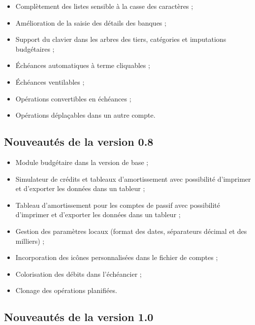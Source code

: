 \begin{itemize}
	\item Complètement des listes sensible à la casse des caractères ;
	\item Amélioration de la saisie des détails des banques ;
	\item Support du clavier dans les arbres des tiers, catégories et imputations 
budgétaires ;
	\item Échéances automatiques à terme cliquables ;
	\item Échéances ventilables ;
	\item Opérations convertibles en échéances ;
	\item Opérations déplaçables dans un autre compte.
\end{itemize}


\subsection{Nouveautés de la version 0.8}

\begin{itemize}
	\item Module budgétaire dans la version de base ;
	\item Simulateur de crédits et tableaux d'amortissement avec possibilité d'imprimer et d'exporter les données dans un tableur ;
	\item Tableau d'amortissement pour les comptes de passif avec possibilité d'imprimer et d'exporter les données dans un tableur ;
	\item Gestion des paramètres locaux (format des dates, séparateurs décimal et des milliers) ;
	\item Incorporation des icônes personnalisées dans le fichier de comptes ;
	\item Colorisation des débits dans l'échéancier ;
	\item Clonage des opérations planifiées.
\end{itemize}

\newpage


\subsection{Nouveautés de la version 1.0}



